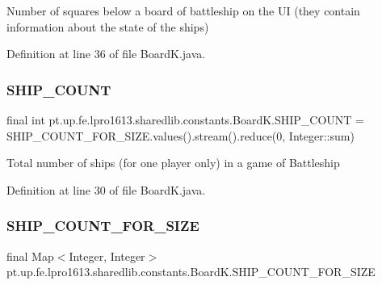 Number of squares below a board of battleship on the UI (they contain information about the state of the ships) 

Definition at line 36 of file Board\+K.\+java.

\hypertarget{classpt_1_1up_1_1fe_1_1lpro1613_1_1sharedlib_1_1constants_1_1_board_k_ae2fc4102eec84d733b9ca1136687284a}{}\label{classpt_1_1up_1_1fe_1_1lpro1613_1_1sharedlib_1_1constants_1_1_board_k_ae2fc4102eec84d733b9ca1136687284a} 
\subsubsection{\texorpdfstring{S\+H\+I\+P\+\_\+\+C\+O\+U\+NT}{SHIP\_COUNT}}
{\footnotesize\ttfamily final int pt.\+up.\+fe.\+lpro1613.\+sharedlib.\+constants.\+Board\+K.\+S\+H\+I\+P\+\_\+\+C\+O\+U\+NT = S\+H\+I\+P\+\_\+\+C\+O\+U\+N\+T\+\_\+\+F\+O\+R\+\_\+\+S\+I\+Z\+E.\+values().stream().reduce(0, Integer\+::sum)\hspace{0.3cm}{\ttfamily [static]}}

Total number of ships (for one player only) in a game of Battleship 

Definition at line 30 of file Board\+K.\+java.

\hypertarget{classpt_1_1up_1_1fe_1_1lpro1613_1_1sharedlib_1_1constants_1_1_board_k_af6ff24deb48459109356bdad0fca5e3b}{}\label{classpt_1_1up_1_1fe_1_1lpro1613_1_1sharedlib_1_1constants_1_1_board_k_af6ff24deb48459109356bdad0fca5e3b} 
\subsubsection{\texorpdfstring{S\+H\+I\+P\+\_\+\+C\+O\+U\+N\+T\+\_\+\+F\+O\+R\+\_\+\+S\+I\+ZE}{SHIP\_COUNT\_FOR\_SIZE}}
{\footnotesize\ttfamily final Map$<$Integer, Integer$>$ pt.\+up.\+fe.\+lpro1613.\+sharedlib.\+constants.\+Board\+K.\+S\+H\+I\+P\+\_\+\+C\+O\+U\+N\+T\+\_\+\+F\+O\+R\+\_\+\+S\+I\+ZE\hspace{0.3cm}{\ttfamily [static]}}

